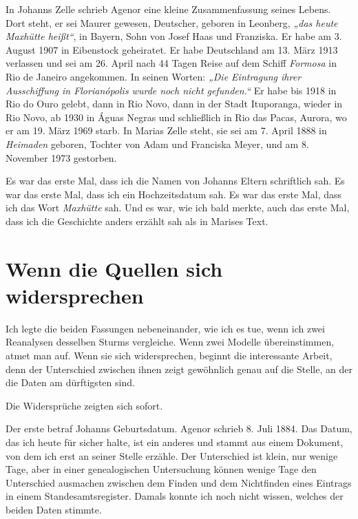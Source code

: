 \documentclass[
  ngerman,
  11pt,
  openany]{book}
\begin{document}
In Johanns Zelle schrieb Agenor eine kleine Zusammenfassung seines
Lebens. Dort steht, er sei Maurer gewesen, Deutscher, geboren in
Leonberg, \emph{„das heute Maxhütte heißt``}, in Bayern, Sohn von Josef
Haas und Franziska. Er habe am 3. August 1907 in Eibenstock geheiratet.
Er habe Deutschland am 13. März 1913 verlassen und sei am 26. April nach
44 Tagen Reise auf dem Schiff \emph{Formosa} in Rio de Janeiro
angekommen. In seinen Worten: \emph{„Die Eintragung ihrer Ausschiffung
in Florianópolis wurde noch nicht gefunden.``} Er habe bis 1918 in Rio
do Ouro gelebt, dann in Rio Novo, dann in der Stadt Ituporanga, wieder
in Rio Novo, ab 1930 in Águas Negras und schließlich in Rio das Pacas,
Aurora, wo er am 19. März 1969 starb. In Marias Zelle steht, sie sei am
7. April 1888 in \emph{Heimaden} geboren, Tochter von Adam und Franciska
Meyer, und am 8. November 1973 gestorben.

Es war das erste Mal, dass ich die Namen von Johanns Eltern schriftlich
sah. Es war das erste Mal, dass ich ein Hochzeitsdatum sah. Es war das
erste Mal, dass ich das Wort \emph{Maxhütte} sah. Und es war, wie ich
bald merkte, auch das erste Mal, dass ich die Geschichte anders erzählt
sah als in Marises Text.

\section{Wenn die Quellen sich
widersprechen}\label{wenn-die-quellen-sich-widersprechen}

Ich legte die beiden Fassungen nebeneinander, wie ich es tue, wenn ich
zwei Reanalysen desselben Sturms vergleiche. Wenn zwei Modelle
übereinstimmen, atmet man auf. Wenn sie sich widersprechen, beginnt die
interessante Arbeit, denn der Unterschied zwischen ihnen zeigt
gewöhnlich genau auf die Stelle, an der die Daten am dürftigsten sind.

Die Widersprüche zeigten sich sofort.

Der erste betraf Johanns Geburtsdatum. Agenor schrieb 8. Juli 1884. Das
Datum, das ich heute für sicher halte, ist ein anderes und stammt aus
einem Dokument, von dem ich erst an seiner Stelle erzähle. Der
Unterschied ist klein, nur wenige Tage, aber in einer genealogischen
Untersuchung können wenige Tage den Unterschied ausmachen zwischen dem
Finden und dem Nichtfinden eines Eintrags in einem Standesamtsregister.
Damals konnte ich noch nicht wissen, welches der beiden Daten stimmte.
\end{document}
